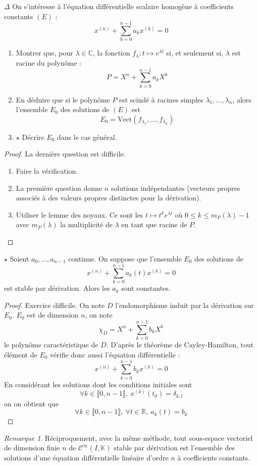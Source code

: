 \documentclass[french,a4paper]{article}
\newcommand{\R}{\mathbb{R}}
\newcommand{\C}{\mathbb{C}}
\newcommand{\K}{\mathbb{K}}
\theoremstyle{plain}
\theoremstyle{definition}
\theoremstyle{remark}
\newtheorem*{rmq}{Remarque}
\begin{document}
\begin{ex}[Moulin.42]{$\Delta$}
	On s'intéresse à l'équation différentielle scalaire homogène à coefficients constants $(E)$ : $$x^{(n)}+\sum_{k=0}^{n-1}a_kx^{(k)}=0$$
	\begin{enumerate}
		\item Montrer que, pour $\lambda\in\C$, la fonction $f_\lambda :t\mapsto e^{\lambda t}$ si, et seulement si, $\lambda$ est racine du polynôme : $$P=X^n+\sum_{k=0}^{n-1}a_kX^k$$
		\item En déduire que si le polynôme $P$ est scindé à racines simples $\lambda_1,\ldots,\lambda_n$, alors l'ensemble $E_0$ des solutions de $(E)$ est $$E_0=\text{Vect}(f_{\lambda_1},\ldots,f_{\lambda_n})$$
		\item $\star$ Décrire $E_0$ dans le cas général.
	\end{enumerate}
\end{ex}
\begin{proof}
	La dernière question est difficile.
	\begin{enumerate}
		\item Faire la vérification.
		\item La première question donne $n$ solutions indépendantes (vecteurs propres associés à des valeurs propres distinctes pour la dérivation).
		\item Utiliser le lemme des noyaux. Ce sont les $t\mapsto t^ke^{\lambda t}$ où $0\leqslant k\leqslant m_P(\lambda)-1$ avec $m_P(\lambda)$ la multiplicité de $\lambda$ en tant que racine de $P$.
	\end{enumerate}
\end{proof}

\begin{ex}[Moulin.43]{$\star$}
	Soient $a_0,\ldots,a_{n-1}$ continue. On suppose que l'ensemble $E_0$ des solutions de $$x^{(n)}+\sum_{k=0}^{n-1}a_k(t)x^{(k)}=0$$ est stable par dérivation. Alors les $a_k$ sont constantes.
\end{ex}
\begin{proof}
	Exercice difficile. On note $D$ l'endomorphisme induit par la dérivation sur $E_0$. $E_0$ est de dimension $n$, on note $$\chi_D=X^n+\sum_{k=0}^{n-1}b_kX^k$$ le polynôme caractéristique de $D$. D'après le théorème de Cayley-Hamilton, tout élément de $E_0$ vérifie donc aussi l'équation différentielle : $$x^{(n)}+\sum_{k=0}^{n-1}b_kx^{(k)}=0$$ En considérant les solutions dont les conditions initiales sont $$\forall k\in\llbracket0,n-1\rrbracket,\ x^{(k)}(t_0)=\delta_{k,l}$$ on on obtient que $$\forall k\in\llbracket0,n-1\rrbracket,\ \forall t\in\R,\ a_k(t)=b_k$$
\end{proof}
\begin{rmq}
	Réciproquement, avec la même méthode, tout sous-espace vectoriel de dimension finie $n$ de $\mathcal{C}^{\infty}(I,\K)$ stable par dérivation est l'ensemble des solutions d'une équation différentielle linéaire d'ordre $n$ à coefficients constants.
\end{rmq}
\end{document}
